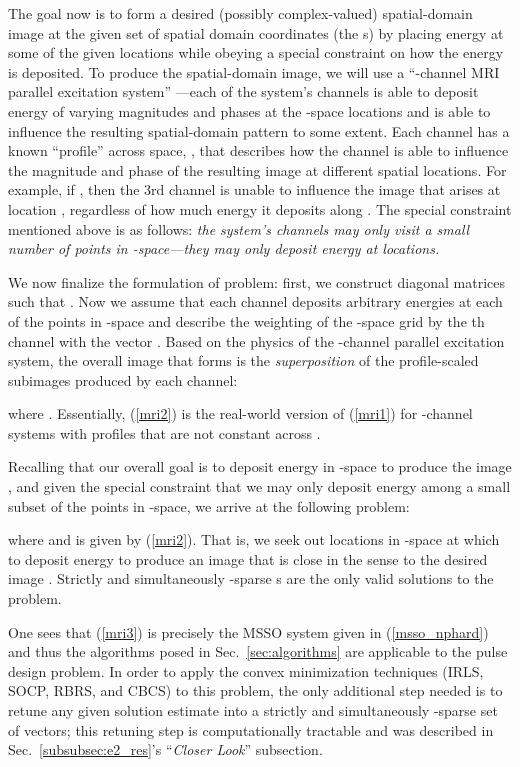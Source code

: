 \documentclass[final]{siamltex}
\newcommand{\la}[1]{\mbox{}}  \newcommand{\sst}[1]{\mbox{\scriptsize{#1}}}
\begin{document}
   The goal now is to form a desired (possibly complex-valued)
   spatial-domain image  at the given set of spatial domain
   coordinates (the s) by placing energy at some of the
   given  locations while obeying a special constraint on
   how the energy is deposited.  To produce the spatial-domain image,
   we will use a ``-channel MRI parallel excitation system''
   \cite{Kat2003, Set2006}---each of the system's  channels is able
   to deposit energy of varying magnitudes and phases at the -space
   locations and is able to influence the resulting spatial-domain
   pattern  to some extent. Each channel  has a known
   ``profile'' across space, , that
   describes how the channel is able to influence the magnitude and
   phase of the resulting image at different spatial locations.  For
   example, if , then the 3rd channel is unable to
   influence the image that arises at location , regardless
   of how much energy it deposits along .
   The special constraint mentioned above is as follows: {\em{the
   system's channels may only visit a small number of points in
   -space---they may only deposit energy at  locations.}}

   We now finalize the formulation of problem: first, we construct 
   diagonal matrices  such that
   .  Now we assume that each channel
   deposits arbitrary energies at each of the  points in -space
   and describe the weighting of the -space grid by the th channel with the vector
   .  Based on the physics of the
   -channel parallel excitation system, the overall image
    that forms is the {\em{superposition}} of the
   profile-scaled subimages produced by each channel:
   
   where .
   Essentially, (\ref{mri2}) is the real-world version of (\ref{mri1})
   for -channel systems with profiles  that are
   not constant across \la{r}.

   Recalling that our overall goal is to deposit energy in -space
   to produce the image , and given the special constraint that we
   may only deposit energy among a small subset of the  points in
   -space, we arrive at the following problem:
   
   where  and  is given by
   (\ref{mri2}).  That is, we seek out  locations in -space
   at which to deposit energy to produce an image  that is
   close in the  sense to the desired image .
   Strictly and simultaneously -sparse s are the
   only valid solutions to the problem.

   One sees that (\ref{mri3}) is precisely the MSSO system given in
   (\ref{msso_nphard}) and thus the algorithms posed in
   Sec.~\ref{sec:algorithms} are applicable to the pulse design
   problem.  In order to apply the convex minimization techniques
   (IRLS, SOCP, RBRS, and CBCS) to this problem, the only additional
   step needed is to retune any given solution estimate
    into a strictly
   and simultaneously -sparse set of vectors; this retuning step is
   computationally tractable and was described in
   Sec.~\ref{subsubsec:e2_res}'s ``{\em{Closer Look}}'' subsection.
\end{document}
